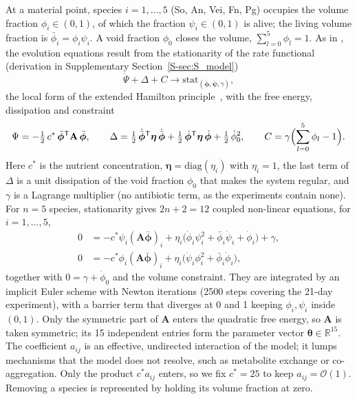 \documentclass[preprint,12pt]{elsarticle}
\newcommand{\btheta}{\boldsymbol{\theta}}
\newcommand{\bphi}{\boldsymbol{\phi}}
\newcommand{\bpsi}{\boldsymbol{\psi}}
\begin{document}
At a material point, species $i=1,\dots,5$ (So, An, Vei, Fn, Pg) occupies the volume fraction $\phi_i\in(0,1)$, of which the fraction $\psi_i\in(0,1)$ is alive; the living volume fraction is $\bar\phi_i=\phi_i\psi_i$.
A void fraction $\phi_0$ closes the volume, $\sum_{l=0}^{5}\phi_l=1$.
As in \citet{Klempt2025ContinuumBiofilm}, the evolution equations result from the stationarity of the rate functional (derivation in Supplementary Section~\ref{S-sec:S_model})
\begin{equation}
\dot\Psi+\Delta+C\rightarrow\mathrm{stat}_{(\dot{\bphi},\dot{\bpsi},\gamma)},
\label{eq:stat}
\end{equation}
the local form of the extended Hamilton principle~\citep{JunkerBalzani2021ExtendedHamilton, JunkerBodeHackl2025Holistic, junker2014principle, hackl1997generalized}, with the free energy, dissipation and constraint
\begin{equation}
\Psi=-\tfrac12\,c^*\,\bar{\bphi}^{\mathsf T}\mathbf{A}\,\bar{\bphi},\qquad
\Delta=\tfrac12\,\dot{\bar{\bphi}}^{\mathsf T}\boldsymbol\eta\,\dot{\bar{\bphi}}+\tfrac12\,\dot{\bphi}^{\mathsf T}\boldsymbol\eta\,\dot{\bphi}+\tfrac12\,\dot\phi_0^2,\qquad
C=\gamma\Bigl(\sum_{l=0}^{5}\phi_l-1\Bigr).
\label{eq:potentials}
\end{equation}
Here $c^*$ is the nutrient concentration, $\boldsymbol\eta=\mathrm{diag}(\eta_i)$ with $\eta_i=1$, the last term of $\Delta$ is a unit dissipation of the void fraction $\phi_0$ that makes the system regular, and $\gamma$ is a Lagrange multiplier (no antibiotic term, as the experiments contain none).
For $n=5$ species, stationarity gives $2n+2=12$ coupled non-linear equations, for $i=1,\dots,5$,
\begin{align}
0&=-c^*\psi_i(\mathbf{A}\bar{\bphi})_i+\eta_i\bigl(\dot\phi_i\psi_i^2+\bar\phi_i\dot\psi_i+\dot\phi_i\bigr)+\gamma,\label{eq:phi}\\
0&=-c^*\phi_i(\mathbf{A}\bar{\bphi})_i+\eta_i\bigl(\dot\psi_i\phi_i^2+\bar\phi_i\dot\phi_i\bigr),\label{eq:psi}
\end{align}
together with $0=\gamma+\dot\phi_0$ and the volume constraint.
They are integrated by an implicit Euler scheme with Newton iterations (2500 steps covering the 21-day experiment), with a barrier term that diverges at 0 and 1 keeping $\phi_i,\psi_i$ inside $(0,1)$.
Only the symmetric part of $\mathbf{A}$ enters the quadratic free energy, so $\mathbf{A}$ is taken symmetric; its 15 independent entries form the parameter vector $\btheta\in\mathbb{R}^{15}$.
The coefficient $a_{ij}$ is an effective, undirected interaction of the model; it lumps mechanisms that the model does not resolve, such as metabolite exchange or co-aggregation.
Only the product $c^*a_{ij}$ enters, so we fix $c^*=25$ to keep $a_{ij}=\mathcal{O}(1)$.
Removing a species is represented by holding its volume fraction at zero.
\end{document}
